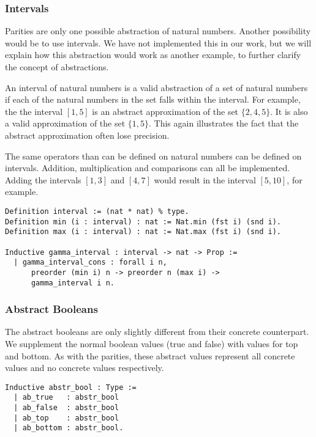 \subsubsection{Intervals}
Parities are only one possible abstraction of natural numbers. Another
possibility would be to use intervals. We have not implemented this in our
work, but we will explain how this abstraction would work as another example,
to further clarify the concept of abstractions.

An interval of natural numbers is a valid abstraction of a set of natural
numbers if each of the natural numbers in the set falls within the interval.
For example, the the interval $[1,5]$ is an abstract approximation of the set
$\{2, 4, 5\}$. It is also a valid approximation of the set $\{1,5\}$. This
again illustrates the fact that the abstract approximation often lose 
precision.

The same operators than can be defined on natural numbers can be defined on
intervals. Addition, multiplication and comparisons can all be implemented.
Adding the intervals $[1,3]$ and $[4, 7]$ would result in the interval $[5,
10]$, for example. 

\begin{listing}
\begin{verbatim}
Definition interval := (nat * nat) % type.
Definition min (i : interval) : nat := Nat.min (fst i) (snd i).
Definition max (i : interval) : nat := Nat.max (fst i) (snd i).

Inductive gamma_interval : interval -> nat -> Prop :=
  | gamma_interval_cons : forall i n, 
      preorder (min i) n -> preorder n (max i) ->
      gamma_interval i n.
\end{verbatim}
\end{listing}

\subsubsection{Abstract Booleans}
The abstract booleans are only slightly different from their concrete
counterpart. We supplement the normal boolean values (true and false) with
values for top and bottom. As with the parities, these abstract values
represent all concrete values and no concrete values respectively.

\begin{verbatim}
Inductive abstr_bool : Type :=
  | ab_true   : abstr_bool
  | ab_false  : abstr_bool
  | ab_top    : abstr_bool
  | ab_bottom : abstr_bool.
\end{verbatim}

